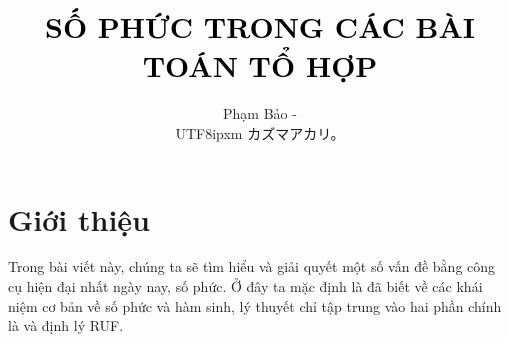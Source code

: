 \documentclass[12pt]{scrartcl}
\begin{document}
\title{\vspace{-2em}\textcolor{black}{\textbf{\LARGE SỐ PHỨC TRONG CÁC BÀI TOÁN TỔ HỢP}}}
\makeatletter

\author{\Large Phạm Bảo -\begin{CJK}{UTF8}{ipxm} カズマアカリ。\end{CJK}\vspace{-1em}}


\maketitle
\thispagestyle{empty}

\tableofcontents
\thispagestyle{plain}
\newpage 
\section{\Large Giới thiệu}
Trong bài viết này, chúng ta sẽ tìm hiểu và giải quyết một số vấn đề bằng công cụ hiện đại nhất ngày nay, số phức. Ở đây ta mặc định là đã biết về các khái niệm cơ bản về số phức và hàm sinh, lý thuyết chỉ tập trung vào hai phần chính là  và {định lý RUF}.
\end{document}
